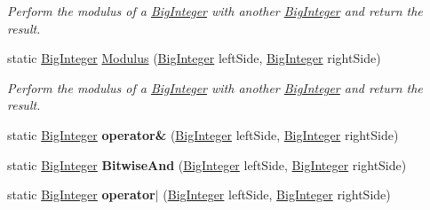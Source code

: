 \begin{DoxyCompactItemize}
\begin{DoxyCompactList}\small\item\em Perform the modulus of a \hyperlink{class_scott_garland_1_1_big_integer}{Big\+Integer} with another \hyperlink{class_scott_garland_1_1_big_integer}{Big\+Integer} and return the result. \end{DoxyCompactList}\item 
static \hyperlink{class_scott_garland_1_1_big_integer}{Big\+Integer} \hyperlink{class_scott_garland_1_1_big_integer_a99ca834445147bc4de1d108376a790c3}{Modulus} (\hyperlink{class_scott_garland_1_1_big_integer}{Big\+Integer} left\+Side, \hyperlink{class_scott_garland_1_1_big_integer}{Big\+Integer} right\+Side)
\begin{DoxyCompactList}\small\item\em Perform the modulus of a \hyperlink{class_scott_garland_1_1_big_integer}{Big\+Integer} with another \hyperlink{class_scott_garland_1_1_big_integer}{Big\+Integer} and return the result. \end{DoxyCompactList}\item 
\mbox{\label{class_scott_garland_1_1_big_integer_a41718b5e26902e535502174c88229302}} 
static \hyperlink{class_scott_garland_1_1_big_integer}{Big\+Integer} {\bfseries operator\&} (\hyperlink{class_scott_garland_1_1_big_integer}{Big\+Integer} left\+Side, \hyperlink{class_scott_garland_1_1_big_integer}{Big\+Integer} right\+Side)
\item 
\mbox{\label{class_scott_garland_1_1_big_integer_a05ff68999479aa04b422ddb59ea5fd61}} 
static \hyperlink{class_scott_garland_1_1_big_integer}{Big\+Integer} {\bfseries Bitwise\+And} (\hyperlink{class_scott_garland_1_1_big_integer}{Big\+Integer} left\+Side, \hyperlink{class_scott_garland_1_1_big_integer}{Big\+Integer} right\+Side)
\item 
\mbox{\label{class_scott_garland_1_1_big_integer_a8fb34bd1a5f4e2b8bfdf5f28dc623e63}} 
static \hyperlink{class_scott_garland_1_1_big_integer}{Big\+Integer} {\bfseries operator$\vert$} (\hyperlink{class_scott_garland_1_1_big_integer}{Big\+Integer} left\+Side, \hyperlink{class_scott_garland_1_1_big_integer}{Big\+Integer} right\+Side)
\item 
\mbox{\label{class_scott_garland_1_1_big_integer_a6ef707f9d6bdf4add7be91ab89a7ac05}} 

\end{DoxyCompactItemize}
